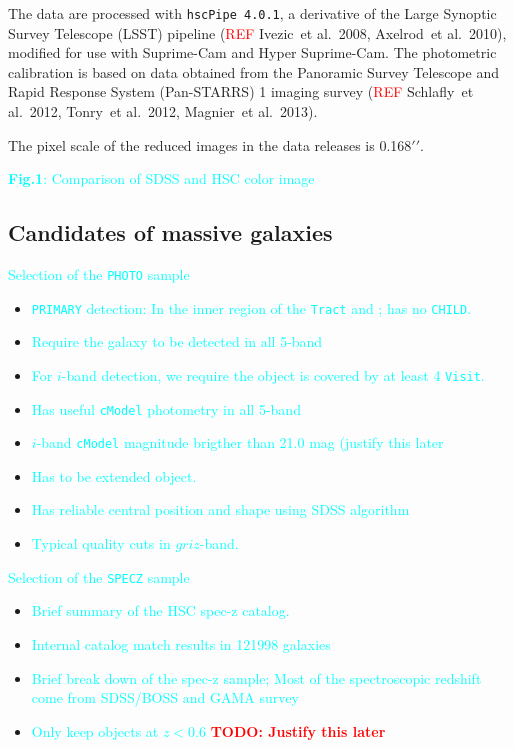\documentclass[preprint]{aastex}
\def\arcsec{{\prime\prime}}
\def\etal{{\ et al.~}}
\newcommand{\todo}[1]{\textcolor{red}{\textbf{TODO: #1}}}
\newcommand{\plan}[1]{\textcolor{cyan}{#1}}
\newcommand{\addref}[1]{\textcolor{red}{REF}}
\begin{document}
\begin{CJK*}{UTF8}{gbsn}
    The data are processed with \texttt{hscPipe 4.0.1}, a derivative of the Large Synoptic 
    Survey Telescope (LSST) pipeline (\addref: Ivezic\etal 2008, Axelrod\etal 2010), 
    modified for use with Suprime-Cam and Hyper Suprime-Cam.  The photometric calibration 
    is based on data obtained from the Panoramic Survey Telescope and Rapid Response 
    System (Pan-STARRS) 1 imaging survey (\addref: Schlafly\etal 2012, Tonry\etal 2012, 
    Magnier\etal 2013).  

    The pixel scale of the reduced images in the data releases is 0.168$\arcsec$.

    \plan{\textbf{Fig.1}: Comparison of SDSS and HSC color image}
    
\subsection{Candidates of massive galaxies}

    \plan{Selection of the \texttt{PHOTO} sample}
    \begin{itemize}
        \item \plan{\texttt{PRIMARY} detection: In the inner region of the \texttt{Tract}
            and \textt{Patch}; has no \texttt{CHILD}.}
        \item \plan{Require the galaxy to be detected in all 5-band}
        \item \plan{For $i$-band detection, we require the object is covered by at least 
            4 \texttt{Visit}.}
        \item \plan{Has useful \texttt{cModel} photometry in all 5-band}
        \item \plan{$i$-band \texttt{cModel} magnitude brigther than 21.0 mag (justify this 
            later}
        \item \plan{Has to be extended object.}
        \item \plan{Has reliable central position and shape using SDSS algorithm}
        \item \plan{Typical quality cuts in $griz$-band.}
    \end{itemize}
    
    \plan{Selection of the \texttt{SPECZ} sample}
    \begin{itemize}
        \item \plan{Brief summary of the HSC spec-z catalog.}
        \item \plan{Internal catalog match results in 121998 galaxies}
        \item \plan{Brief break down of the spec-z sample; Most of the spectroscopic 
            redshift come from SDSS/BOSS and GAMA survey}
        \item \plan{Only keep objects at $z < 0.6$} \todo{Justify this later}
    \end{itemize}


\end{CJK*}
\end{document}
